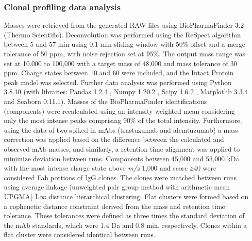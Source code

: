\subsubsection{Clonal profiling data analysis}
Masses were retrieved from the generated RAW files using BioPharmaFinder 3.2 (Thermo Scientific). Deconvolution was performed using the ReSpect algorithm between 5 and 57 min using 0.1 min sliding window with 50\% offset and a merge tolerance of 50 ppm, with noise rejection set at 95\%. The output mass range was set at 10,000 to 100,000 with a target mass of 48,000 and mass tolerance of 30 ppm. Charge states between 10 and 60 were included, and the Intact Protein peak model was selected. Further data analysis was performed using Python 3.8.10 (with libraries: Pandas 1.2.4 \cite{mckinney2010data}, Numpy 1.20.2 \cite{walt2011numpy}, Scipy 1.6.2 \cite{virtanen2020scipy}, Matplotlib 3.3.4 \cite{hunter2007matplotlib:} and Seaborn 0.11.1). Masses of the BioPharmaFinder identifications (components) were recalculated using an intensity weighted mean considering only the most intense peaks comprising 90\% of the total intensity. Furthermore, using the data of two spiked-in mAbs (trastuzumab and alemtuzumab) a mass correction was applied based on the difference between the calculated and observed mAb masses, and similarly, a retention time alignment was applied to minimize deviation between runs.
Components between 45,000 and 53,000 kDa with the most intense charge state above \emph{m/z} 1,000 and score ≥40 were considered Fab portions of IgG clones. The clones were matched between runs using average linkage (unweighted pair group method with arithmetic mean UPGMA) L∞ distance hierarchical clustering. Flat clusters were formed based on a cophenetic distance constraint derived from the mass and retention time tolerance. These tolerances were defined as three times the standard deviation of the mAb standards, which were 1.4 Da and 0.8 min, respectively. Clones within a flat cluster were considered identical between runs.

